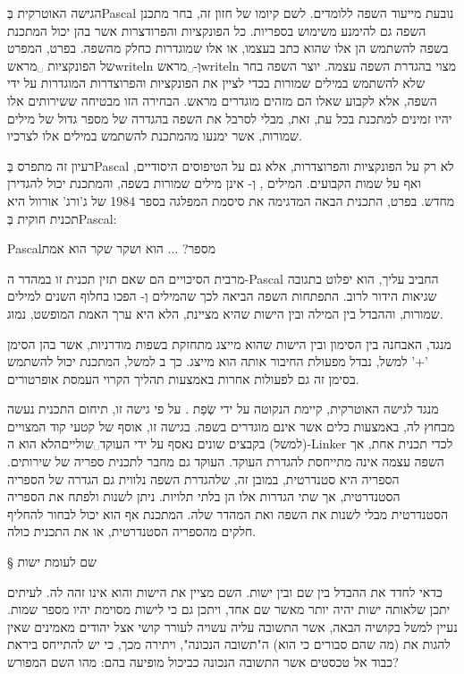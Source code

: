 הגישה האוטרקית בְּPascal נובעת מייעוד השפה ללומדים. לשם קיומו של חזון זה, בחר מתכנן השפה גם להימנע משימוש בספריות. כל הפונקציות והפרודצרות אשר בהן יכול המתכנת בשפה להשתמש הן אלו שהוא כתב בעצמו, או אלו שמוגדרות כחלק מהשפה. בפרט, המפרט של הפונקציות ␣מראש{writeln} וְ-␣מראש{writeln} מצוי בהגדרת השפה עצמה. יוצר השפה בחר שלא להשתמש במילים שמורות בכדי לציין את הפונקציות והפרוצדרות המוגדרות על ידי השפה, אלא לקבוע שאלו הם מזהים מוגדרים מראש. הבחירה הזו מבטיחה ששירותים אלו יהיו זמינים למתכנת בכל עת, זאת, מבלי לסרבל את השפה בהגדרה של מספר גדול של מילים שמורות, אשר ימנעו מהמתכנת להשתמש במילים אלו לצרכיו.

רעיון זה מתפרס בְּPascal לא רק על הפונקציות והפרוצדרות, אלא גם על הטיפוסים
היסודיים, ואף על שמות הקבועים. המילים ,  וְ- אינן
מילים שמורות בשפה, והמתכנת יכול להגדירן מחדש. בפרט, התכנית הבאה המדגימה את
סיסמת המפלגה בספר 1984 של ג'ורג' אורוול היא תכנית חוקית בְּPascal:

{Pascal}{מספר? ... הוא ושקר שקר הוא אמת}

מרבית הסיכויים הם שאם תזין תכנית זו במהדר ה-Pascal החביב עליך, הוא יפלוט בתגובה
שגיאות הידור לרוב. התפתחות השפה הביאה לכך שהמילים  וְ- הפכו
בחלוף השנים למילים שמורות, וההבדל בין המילה  ובין הישות שהיא מציינת,
הלא היא ערך האמת המופשט, נמוג.

מנגד, האבחנה בין הסימון ובין הישות שהוא מייצג מתחזקת בשפות מודרניות, אשר בהן
הסימן '+' למשל, נבדל מפעולת החיבור אותה הוא מייצג. כך ב למשל, המתכנת
יכול להשתמש בסימן זה גם לפעולות אחרות באמצעות תהליך הקרוי העמסת אופרטורים.

מנגד לגישה האוטרקית, קיימת  הנקוטה על ידי שְׂפַת . על פי
גישה זו, תיחום התכנית נעשה מבחוץ לה, באמצעות כלים אשר אינם מוגדרים בשפה. בגישה
זו, אוסף של קטעי קוד המצויים (למשל) בקבצים שונים נאסף על ידי
העוקד␣שוליים{הלא הוא ה-Linker} לכדי תכנית אחת, אך השפה עצמה אינה מתייחסת
להגדרת העוקד. העוקד גם מחבר לתכנית ספריה של שירותים. הספריה היא סטנדרטית, במובן
זה, שלהגדרת השפה נלווית גם הגדרה של הספריה הסטנדרטית, אך שתי הגדרות אלו הן בלתי
תלויות. ניתן לשנות ולפתח את הספריה הסטנדרטית מבלי לשנות את השפה ואת המהדר שלה.
המתכנת אף הוא יכול לבחור להחליף חלקים מהספריה הסטנדרטית, או את התכנית כולה.

§ שם לעומת ישות

כדאי לחדד את ההבדל בין שם ובין ישות. השם מציין את הישות והוא אינו זהה לה.
לעיתים יתכן שלאותה ישות יהיה יותר מאשר שם אחד, ויתכן גם כי לישות מסוימת יהיו
מספר שמות.  נעיין למשל בקושיה הבאה, אשר התשובה עליה עשויה לעורר קושי אצל יהודים
מאמינים שאין להגות את (מה שהם סבורים כי הוא) ה"תשובה הנכונה", ויתירה מכך,
כי יש להתייחס ביראת כבוד אל טכסטים אשר התשובה הנכונה כביכול מופיעה בהם:
מהו השם המפורש?

